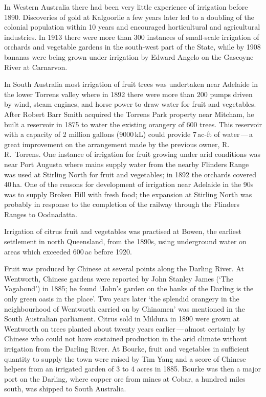 In Western Australia there had been very little experience of
irrigation before 1890.  Discoveries of gold at Kalgoorlie a few years
later led to a doubling of the colonial population within 10 years and
encouraged horticultural and agricultural industries.  In 1913 there
were more than 300 instances of small-scale irrigation of orchards and
vegetable gardens in the south-west part of the State, while by 1908
bananas were being grown under irrigation by Edward Angelo on the
Gascoyne River at Carnarvon.

In South Australia most irrigation of fruit trees was undertaken near
Adelaide in the lower Torrens valley where in 1892 there were more
than 200 pumps driven by wind, steam engines, and horse power to draw
water for fruit and vegetables.  After Robert Barr Smith acquired the
Torrens Park property near Mitcham, he built a reservoir in 1875 to
water the existing orangery of 600 trees.  This reservoir with a
capacity of 2 million gallons (9000\,kL) could provide 7\,ac-ft of
water\,---\,a great improvement on the arrangement made by the previous
owner, R.\,R.~Torrens.  One instance of irrigation for fruit growing
under arid conditions was near Port Augusta where mains supply water
from the nearby Flinders Range was used at Stirling North for fruit
and vegetables; in 1892 the orchards covered 40\,ha.  One of the
reasons for development of irrigation near Adelaide in the 90s was to
supply Broken Hill with fresh food; the expansion at Stirling North
was probably in response to the completion of the railway through the
Flinders Ranges to Oodnadatta.

Irrigation of citrus fruit and vegetables was practised at Bowen, the
earliest settlement in north Queensland, from the 1890s, using
underground water on areas which exceeded 600\,ac before
1920.

Fruit was produced by Chinese at several points along the Darling
River.  At Wentworth, Chinese gardens were reported by John Stanley
James (`The Vagabond') in 1885; he found `John's garden on the banks
of the Darling is the only green oasis in the place'. Two years later
`the splendid orangery in the neighbourhood of Wentworth carried on by
Chinamen' was mentioned in the South Australian parliament.  Citrus
sold in Mildura in 1890 were grown at Wentworth on trees planted about
twenty years earlier\,---\,almost certainly by Chinese who could not have
sustained production in the arid climate without irrigation from the
Darling River.  At Bourke, fruit and vegetables in sufficient quantity
to supply the town were raised by Tim Yang and a score of Chinese
helpers from an irrigated garden of 3 to 4 acres in 1885.  Bourke was
then a major port on the Darling, where copper ore from mines at
Cobar, a hundred miles south, was shipped to South
Australia.

